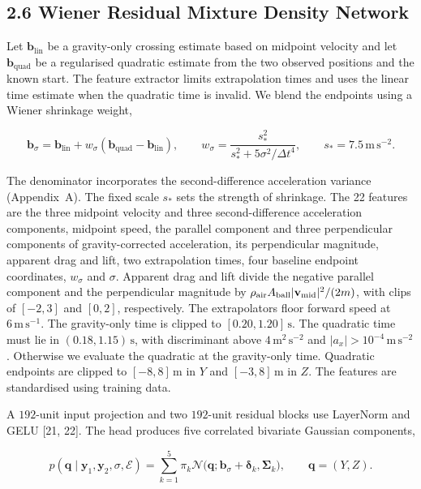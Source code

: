 \subsection{2.6 Wiener Residual Mixture Density Network}

Let $\mathbf b_{\mathrm{lin}}$ be a gravity-only crossing estimate based on midpoint velocity and let $\mathbf b_{\mathrm{quad}}$ be a regularised quadratic estimate from the two observed positions and the known start. The feature extractor limits extrapolation times and uses the linear time estimate when the quadratic time is invalid. We blend the endpoints using a Wiener shrinkage weight,

$$
\mathbf b_\sigma=\mathbf b_{\mathrm{lin}}+w_\sigma
     (\mathbf b_{\mathrm{quad}}-\mathbf b_{\mathrm{lin}}),\qquad
  w_\sigma=\frac{s_*^2}{s_*^2+5\sigma^2/\Delta t^4},\qquad
  s_*=7.5\,\mathrm{m\,s^{-2}} .
$$

The denominator incorporates the second-difference acceleration variance (Appendix~A). The fixed scale $s_*$ sets the strength of shrinkage. The 22 features are the three midpoint velocity and three second-difference acceleration components, midpoint speed, the parallel component and three perpendicular components of gravity-corrected acceleration, its perpendicular magnitude, apparent drag and lift, two extrapolation times, four baseline endpoint coordinates, $w_\sigma$ and $\sigma$. Apparent drag and lift divide the negative parallel component and the perpendicular magnitude by $\rho_{\mathrm{air}} A_{\mathrm{ball}}|\mathbf v_{\rm mid}|^2/(2m)$, with clips of $[-2,3]$ and $[0,2]$, respectively. The extrapolators floor forward speed at $6\,\mathrm{m\,s^{-1}}$. The gravity-only time is clipped to $[0.20,1.20]\,\mathrm{s}$. The quadratic time must lie in $(0.18,1.15)\,\mathrm{s}$, with discriminant above $4\,\mathrm{m^2\,s^{-2}}$ and $|a_x|>10^{-4}\,\mathrm{m\,s^{-2}}$. Otherwise we evaluate the quadratic at the gravity-only time. Quadratic endpoints are clipped to $[-8,8]\,\mathrm{m}$ in $Y$ and $[-3,8]\,\mathrm{m}$ in $Z$. The features are standardised using training data.

A $192$-unit input projection and two $192$-unit residual blocks use LayerNorm and GELU [21, 22]. The head produces five correlated bivariate Gaussian components,

$$
p(\mathbf q\mid\mathbf y_1,\mathbf y_2,\sigma,\mathcal E)
    = \sum_{k=1}^{5} \pi_k
       \mathcal N\bigl(\mathbf q;\mathbf b_\sigma+\boldsymbol\delta_k,
                        \boldsymbol\Sigma_k\bigr),\qquad
       \mathbf q=(Y,Z).
$$

